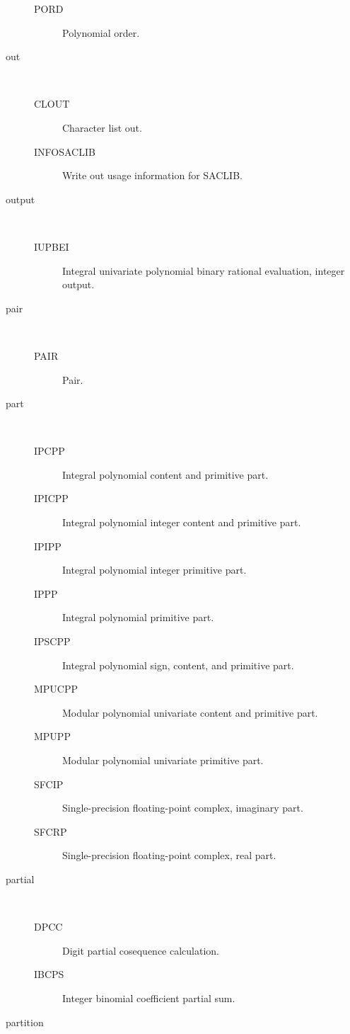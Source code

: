 \begin{description}
\begin{description}
  \item[PORD]  Polynomial order.
  \end{description}
\item[out] \ \ 
  \begin{description}
  \item[CLOUT]  Character list out.
  \item[INFOSACLIB]  Write out usage information for SACLIB.
  \end{description}
\item[output] \ \ 
  \begin{description}
  \item[IUPBEI]  Integral univariate polynomial binary rational evaluation,
    integer output.
  \end{description}
\item[pair] \ \ 
  \begin{description}
  \item[PAIR]  Pair.
  \end{description}
\item[part] \ \ 
  \begin{description}
  \item[IPCPP]  Integral polynomial content and primitive part.
  \item[IPICPP]  Integral polynomial integer content and primitive part.
  \item[IPIPP]  Integral polynomial integer primitive part.
  \item[IPPP]  Integral polynomial primitive part.
  \item[IPSCPP]  Integral polynomial sign, content, and primitive part.
  \item[MPUCPP]  Modular polynomial univariate content and primitive part.
  \item[MPUPP]  Modular polynomial univariate primitive part.
  \item[SFCIP]  Single-precision floating-point complex, imaginary part.
  \item[SFCRP]  Single-precision floating-point complex, real part.
  \end{description}
\item[partial] \ \ 
  \begin{description}
  \item[DPCC]  Digit partial cosequence calculation.
  \item[IBCPS]  Integer binomial coefficient partial sum.
  \end{description}
\item[partition] \ \ 

\end{description}
